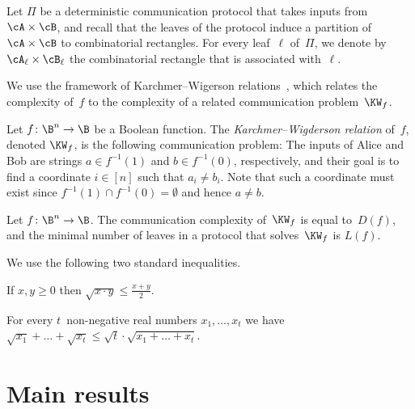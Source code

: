 \begin{notation}
\label{notation:partition-to-rectangles}Let $\Pi$ be a deterministic communication
protocol that takes inputs from $\cA\times\cB$, and recall that the
leaves of the protocol induce a partition of $\cA\times\cB$ to combinatorial
rectangles. For every leaf~$\ell$ of~$\Pi$, we denote by $\cA_{\ell}\times\cB_{\ell}$
the combinatorial rectangle that is associated with~$\ell$. 
\end{notation}

We use the framework of Karchmer--Wigerson relations~\cite{KW90},
which relates the complexity of~$f$ to the complexity of a related
communication problem~$\KW_{f}$. 
\begin{definition}[\cite{KW90}]
Let $f\colon\B^{n}\to\B$ be a Boolean function. The \emph{Karchmer--Wigderson
relation} of~$f$, denoted $\KW_{f}$, is the following communication
problem: The inputs of Alice and Bob are strings $a\in f^{-1}(1)$
and $b\in f^{-1}(0)$, respectively, and their goal is to find a coordinate
$i\in\left[n\right]$ such that $a_{i}\ne b_{i}$. Note that such
a coordinate must exist since $f^{-1}(1)\cap f^{-1}(0)=\emptyset$
and hence $a\ne b$. 
\end{definition}

\begin{theorem}
\label{thm:KW-connection}Let $f\colon\B^{n}\to\B$. The communication
complexity of~$\KW_{f}$ is equal to~$D(f)$, and the minimal number
of leaves in a protocol that solves~$\KW_{f}$ is $L(f)$. 
\end{theorem}

%
We use the following two standard inequalities.
\begin{fact}
%
%
%
%
%
If $x,y\ge 0$ then $\sqrt{x\cdot y}\le\frac{x+y}{2}$.
\end{fact}

\begin{fact}
\label{fact:special-cauchy-schwarz} For every $t$~non-negative real
numbers $x_{1},\ldots,x_{t}$ we have $\sqrt{x_{1}}+\ldots+\sqrt{x_{t}}\le\sqrt{t}\cdot\sqrt{x_{1}+\ldots+x_{t}}$.   \qedhere
\end{fact}

%
%
%
%
%

\section{\label{sec:Main-results}Main results}

